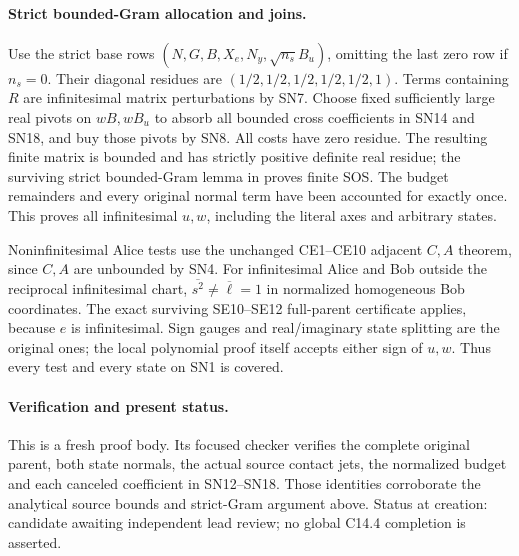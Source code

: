 \paragraph{Strict bounded-Gram allocation and joins.}
Use the strict base rows
$(N,G,B,X_e,N_y,\sqrt{n_s}B_u)$, omitting the last zero row if
$n_s=0$. Their diagonal residues are
$(1/2,1/2,1/2,1/2,1/2,1)$. Terms containing $R$ are
infinitesimal matrix perturbations by SN7. Choose fixed sufficiently
large real pivots on $wB,wB_u$ to absorb all bounded cross
coefficients in SN14 and SN18, and buy those pivots by SN8.
All costs have zero residue. The resulting finite matrix is bounded
and has strictly positive definite real residue; the surviving
strict bounded-Gram lemma in
 proves finite SOS.
The budget remainders and every original normal term have been
accounted for exactly once. This proves all infinitesimal $u,w$,
including the literal axes and arbitrary states.

Noninfinitesimal Alice tests use the unchanged CE1--CE10 adjacent
$C,A$ theorem, since $C,A$ are unbounded by SN4. For infinitesimal
Alice and Bob outside the reciprocal infinitesimal chart,
$\overline{s^2}\ne\overline\ell=1$ in normalized homogeneous
Bob coordinates. The exact surviving SE10--SE12 full-parent
certificate applies, because $e$ is infinitesimal. Sign gauges and
real/imaginary state splitting are the original ones; the local
polynomial proof itself accepts either sign of $u,w$. Thus every
test and every state on SN1 is covered.

\paragraph{Verification and present status.}
This is a fresh proof body. Its focused checker verifies the complete
original parent, both state normals, the actual source contact jets,
the normalized budget and each canceled coefficient in SN12--SN18.
Those identities corroborate the analytical source bounds and
strict-Gram argument above. Status at creation: candidate awaiting
independent lead review; no global C14.4 completion is asserted.
